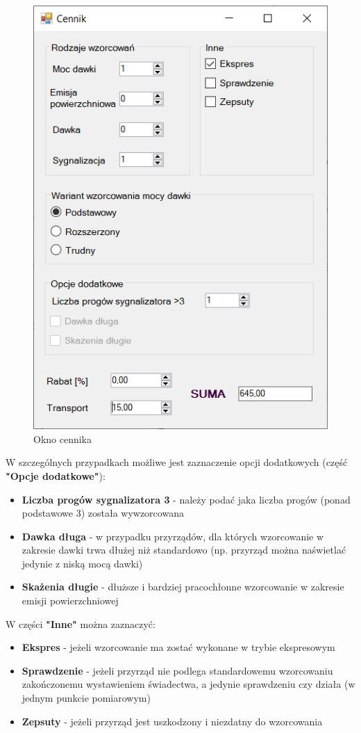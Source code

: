\begin{figure}[htb]
	\centering
	\includegraphics{obrazki/Biuro/cennik.png}
	\caption{Okno cennika}
	\label{cennikRys}
\end{figure}

W szczególnych przypadkach możliwe jest zaznaczenie opcji dodatkowych (część \textbf{"Opcje dodatkowe"}):
\begin{itemize}
	\item \textbf{Liczba progów sygnalizatora  3} - należy podać jaka liczba progów (ponad podstawowe 3) została wywzorcowana
	\item \textbf{Dawka długa} - w przypadku przyrządów, dla których wzorcowanie w zakresie dawki trwa dłużej niż standardowo (np. przyrząd można naświetlać jedynie z niską mocą dawki)
	\item \textbf{Skażenia długie} - dłuższe i bardziej pracochłonne wzorcowanie w zakresie emisji powierzchniowej
\end{itemize}

W części \textbf{"Inne"} można zaznaczyć:
\begin{itemize}
	\item \textbf{Ekspres} - jeżeli wzorcowanie ma zostać wykonane w trybie ekspresowym
	\item \textbf{Sprawdzenie} - jeżeli przyrząd nie podlega standardowemu wzorcowaniu zakończonemu wystawieniem świadectwa, a jedynie sprawdzeniu czy działa (w jednym punkcie pomiarowym)
	\item \textbf{Zepsuty} - jeżeli przyrząd jest uszkodzony i niezdatny do wzorcowania
\end{itemize}

